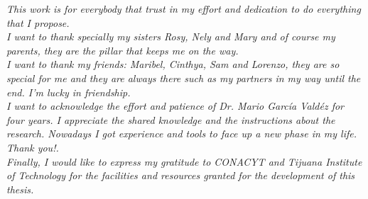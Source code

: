 
\textit{This work is for everybody that trust in my effort and
dedication to do everything that I propose.\\  I want to thank
specially my sisters Rosy, Nely and Mary and of course my parents,
they are the pillar that keeps me on the way.\\  I want to thank my
friends: Maribel, Cinthya, Sam and Lorenzo, they are so special for me
and they are always there such as my partners in my way until the end.
I’m lucky in friendship.\\  I want to acknowledge the effort and
patience of Dr. Mario Garc\'ia Vald\'ez for four years. I appreciate the
shared knowledge and the instructions about the research. Nowadays I
got experience and tools to face up a new phase in my life. Thank you!.\\  
Finally, I would like to express my gratitude to CONACYT and
Tijuana Institute of Technology for the facilities and resources
granted for the development of this thesis.}
